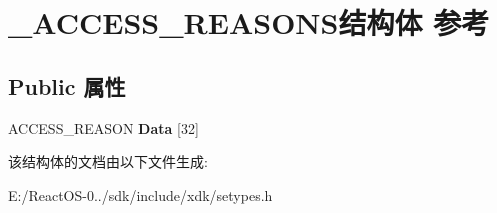 \hypertarget{struct___a_c_c_e_s_s___r_e_a_s_o_n_s}{}\section{\+\_\+\+A\+C\+C\+E\+S\+S\+\_\+\+R\+E\+A\+S\+O\+N\+S结构体 参考}
\label{struct___a_c_c_e_s_s___r_e_a_s_o_n_s}
\subsection*{Public 属性}
\begin{DoxyCompactItemize}
\item 
\mbox{\label{struct___a_c_c_e_s_s___r_e_a_s_o_n_s_a515bdac5de975ccb3f132fd1f2858d3e}} 
A\+C\+C\+E\+S\+S\+\_\+\+R\+E\+A\+S\+ON {\bfseries Data} \mbox{[}32\mbox{]}
\end{DoxyCompactItemize}


该结构体的文档由以下文件生成\+:\begin{DoxyCompactItemize}
\item 
E\+:/\+React\+O\+S-\/0../sdk/include/xdk/setypes.\+h\end{DoxyCompactItemize}
